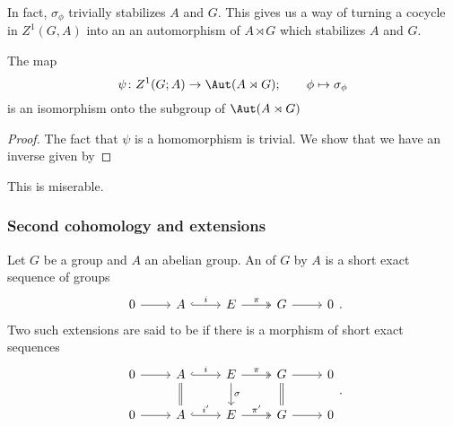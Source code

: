 \documentclass[main.tex]{subfiles}
\begin{document}
In fact, $\sigma_{\phi}$ trivially stabilizes $A$ and $G$. This gives us a way of turning a cocycle in $Z^{1}(G, A)$ into an an automorphism of $A \rtimes G$ which stabilizes $A$ and $G$.

\begin{proposition}
  The map
  \begin{equation*}
    \psi\colon Z^{1}(G; A) \to \Aut(A \rtimes G);\qquad \phi \mapsto \sigma_{\phi}
  \end{equation*}
  is an isomorphism onto the subgroup of $\Aut(A \rtimes G)$
\end{proposition}
\begin{proof}
  The fact that $\psi$ is a homomorphism is trivial. We show that we have an inverse given by
\end{proof}

This is miserable.

\subsubsection{Second cohomology and extensions}
\label{sss:second_cohomology_and_extensions}

\begin{definition}
  \label{def:extension_of_a_group}
  Let $G$ be a group and $A$ an abelian group. An  of $G$ by $A$ is a short exact sequence of groups
  \begin{equation*}
    \begin{tikzcd}
      0
      \arrow[r]
      & A
      \arrow[r, hook, "i"]
      & E
      \arrow[r, two heads, "\pi"]
      & G
      \arrow[r]
      & 0
    \end{tikzcd}.
  \end{equation*}
  Two such extensions are said to be  if there is a morphism of short exact sequences
  \begin{equation*}
    \begin{tikzcd}
      0
      \arrow[r]
      & A
      \arrow[r, hook, "i"]
      \arrow[d, equals]
      & E
      \arrow[r, two heads, "\pi"]
      \arrow[d, "\sigma"]
      & G
      \arrow[r]
      \arrow[d, equals]
      & 0
      \\
      0
      \arrow[r]
      & A
      \arrow[r, hook, "i'"]
      & E
      \arrow[r, two heads, "\pi'"]
      & G
      \arrow[r]
      & 0
    \end{tikzcd}.
  \end{equation*}
\end{definition}
\end{document}
